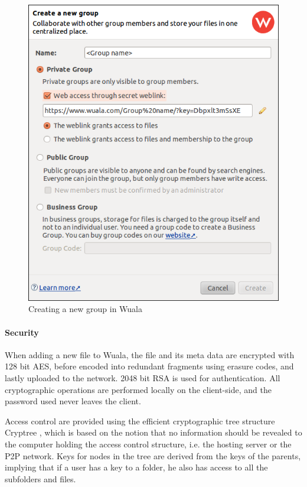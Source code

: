 \documentclass[pdftex,english,10pt,b5paper,twoside]{book}
\begin{document}
\begin{figure}[h!]
    \centering
    \includegraphics[width=\columnwidth]{wuala_create_group.png}
    \caption{Creating a new group in Wuala}
    \label{fig:wuala:newgroup}
\end{figure}

\paragraph{Security} When adding a new file to Wuala, the file and its meta
data are encrypted with 128 bit \ac{AES}, before encoded into redundant
fragments using erasure codes, and lastly uploaded to the network. 2048 bit
\ac{RSA} is used for authentication. All cryptographic operations are performed
locally on the client-side, and the password used never leaves the client.

Access control are provided using the efficient cryptographic tree structure
Cryptree \cite{cryptree, wuala}, which is based on the notion that no
information should be revealed to the computer holding the access control
structure, i.e. the hosting server or the \ac{P2P} network. Keys for nodes in
the tree are derived from the keys of the parents, implying that if a user has
a key to a folder, he also has access to all the subfolders and files.
\end{document}

